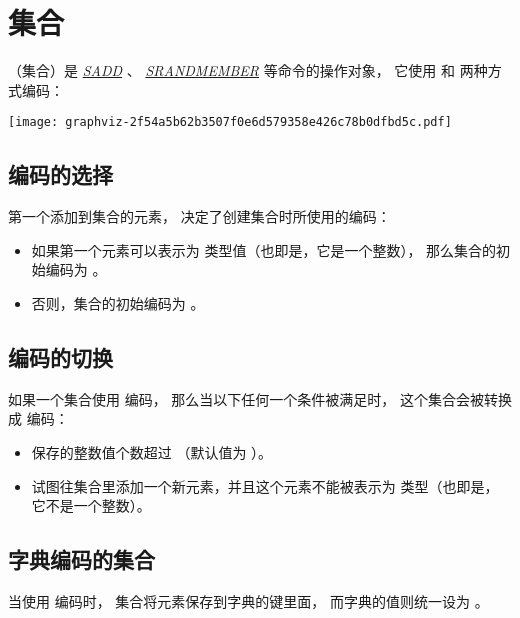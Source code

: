 \documentclass[a4paper,11pt,english]{sphinxmanual}
\begin{document}
\section{集合}
\label{datatype/set:set-chapter}\label{datatype/set::doc}\label{datatype/set:id1}
 （集合）是 \href{http://redis.readthedocs.org/en/latest/set/sadd.html\#sadd}{\emph{SADD}} 、 \href{http://redis.readthedocs.org/en/latest/set/srandmember.html\#srandmember}{\emph{SRANDMEMBER}} 等命令的操作对象，
它使用  和  两种方式编码：

\texttt{[image: graphviz-2f54a5b62b3507f0e6d579358e426c78b0dfbd5c.pdf]}


\subsection{编码的选择}
\label{datatype/set:id2}
第一个添加到集合的元素，
决定了创建集合时所使用的编码：
\begin{itemize}
\item {} 
如果第一个元素可以表示为  类型值（也即是，它是一个整数）， 那么集合的初始编码为  。

\item {} 
否则，集合的初始编码为  。

\end{itemize}


\subsection{编码的切换}
\label{datatype/set:id3}
如果一个集合使用  编码，
那么当以下任何一个条件被满足时，
这个集合会被转换成  编码：
\begin{itemize}
\item {} 
 保存的整数值个数超过  （默认值为  ）。

\item {} 
试图往集合里添加一个新元素，并且这个元素不能被表示为  类型（也即是，它不是一个整数）。

\end{itemize}


\subsection{字典编码的集合}
\label{datatype/set:id4}
当使用  编码时，
集合将元素保存到字典的键里面，
而字典的值则统一设为  。
\end{document}
